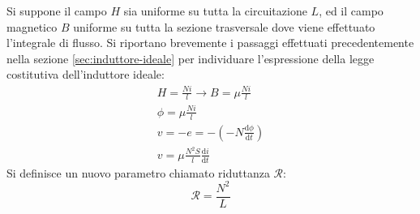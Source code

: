 \documentclass{article}
\newcommand{\df}{\mathrm{d}}
\numberwithin{equation}{subsection}
\begin{document}
Si suppone il campo $H$ sia uniforme su tutta la circuitazione $L$, ed il campo magnetico $B$ uniforme su tutta la sezione trasversale dove viene effettuato l'integrale 
di flusso. Si riportano brevemente i passaggi effettuati precedentemente nella sezione \ref{sec:induttore-ideale} per individuare l'espressione della legge costitutiva 
dell'induttore ideale: 
\begin{gather*}
    H=\displaystyle\frac{Ni}{l}\to B=\mu\displaystyle\frac{Ni}{l}\\
    \phi=\mu\displaystyle\frac{Ni}{l}\\
    v=-e=-\left(-N\displaystyle\frac{\df\phi}{\df t}\right)\\
    v=\displaystyle\mu\frac{N^2S}{l}\frac{\df i}{\df t}
\end{gather*}
Si definisce un nuovo parametro chiamato riduttanza $\mathscr{R}$:
\begin{equation}
    \mathscr{R}=\displaystyle\frac{N^2}{L}
\end{equation}
\end{document}

